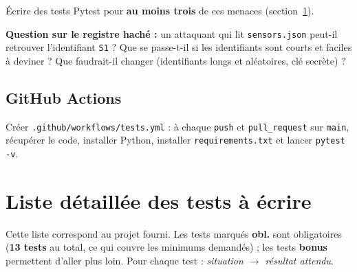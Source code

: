 \documentclass[11pt,a4paper]{article}
\begin{document}
Écrire des tests Pytest pour \textbf{au moins trois} de ces menaces (section~\ref{sec:liste}).

\textbf{Question sur le registre haché :} un attaquant qui lit \texttt{sensors.json} peut-il retrouver
l'identifiant \texttt{S1} ? Que se passe-t-il si les identifiants sont courts et faciles à deviner ?
Que faudrait-il changer (identifiants longs et aléatoires, clé secrète) ?

\subsection{GitHub Actions}

Créer \texttt{.github/workflows/tests.yml} : à chaque \texttt{push} et
\texttt{pull\_request} sur \texttt{main}, récupérer le code, installer Python,
installer \texttt{requirements.txt} et lancer \texttt{pytest -v}.

\section{Liste détaillée des tests à écrire}\label{sec:liste}

Cette liste correspond au projet fourni. Les tests marqués \textbf{obl.} sont
obligatoires (\textbf{13 tests} au total, ce qui couvre les minimums demandés) ; les tests
\textbf{bonus} permettent d'aller plus loin. Pour chaque test : \emph{situation $\rightarrow$
résultat attendu}.

\newcommand{\tabhead}[1]{\multicolumn{4}{|l|}{\cellcolor{blue!12}\textbf{#1}}\\\hline}
\footnotesize
\renewcommand{\arraystretch}{1.25}
\end{document}
